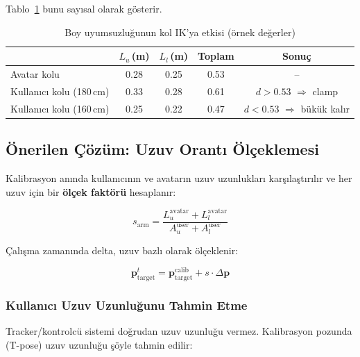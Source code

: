\documentclass[11pt,a4paper]{article}
\begin{document}
Tablo~\ref{tab:ornek} bunu say{\i}sal olarak g\"osterir.

\begin{table}[H]
\centering
\caption{Boy uyumsuzlu\u{g}unun kol IK'ya etkisi (\"ornek de\u{g}erler)}
\label{tab:ornek}
\renewcommand{\arraystretch}{1.2}
\begin{tabular}{lcccc}
\toprule
 & $L_u$\,(m) & $L_l$\,(m) & Toplam & Sonu\c{c} \\
\midrule
Avatar kolu    & 0.28 & 0.25 & 0.53 & -- \\
Kullan{\i}c{\i} kolu (180\,cm) & 0.33 & 0.28 & 0.61 & $d > 0.53$ $\Rightarrow$ clamp \\
Kullan{\i}c{\i} kolu (160\,cm) & 0.25 & 0.22 & 0.47 & $d < 0.53$ $\Rightarrow$ b\"uk\"uk kal{\i}r \\
\bottomrule
\end{tabular}
\end{table}

\subsection{\"Onerilen \c{C}\"oz\"um: Uzuv Orant{\i} \"Ol\c{c}eklemesi}

Kalibrasyon an{\i}nda kullan{\i}c{\i}n{\i}n ve avatar{\i}n uzuv uzunluklar{\i}
kar\c{s}{\i}la\c{s}t{\i}r{\i}l{\i}r ve her uzuv i\c{c}in bir \textbf{\"ol\c{c}ek fakt\"or\"u}
hesaplan{\i}r:

\begin{equation}
    s_{\text{arm}} = \frac{L_u^{\text{avatar}} + L_l^{\text{avatar}}}
    {A_u^{\text{user}} + A_l^{\text{user}}}
    \label{eq:scale_arm}
\end{equation}

\c{C}al{\i}\c{s}ma zaman{\i}nda delta, uzuv bazl{\i} olarak \"ol\c{c}eklenir:

\begin{equation}
    \mathbf{p}_{\text{target}}^{t} = \mathbf{p}_{\text{target}}^{\text{calib}} +
    s \cdot \Delta \mathbf{p}
    \label{eq:scaled_delta}
\end{equation}

\subsubsection{Kullan{\i}c{\i} Uzuv Uzunlu\u{g}unu Tahmin Etme}

Tracker/kontrolc\"u sistemi do\u{g}rudan uzuv uzunlu\u{g}u vermez. Kalibrasyon
pozunda (T-pose) uzuv uzunlu\u{g}u \c{s}\"oyle tahmin edilir:
\end{document}
